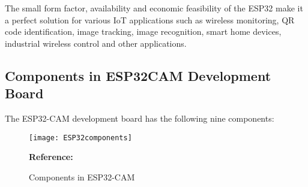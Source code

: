 The small form factor, availability and economic feasibility of the ESP32 make it a perfect solution for various IoT applications such as wireless monitoring, QR code identification, image tracking, image recognition, smart home devices, industrial wireless control and other applications.\\

\subsection{Components in ESP32CAM Development Board}
The ESP32-CAM development board has the following nine components:
\begin{figure}  [H]
	\begin{center}
		\texttt{[image: ESP32components]}
		\caption{Components in ESP32-CAM} 
		\label{fig:Components in ESP32 Cam}
		\footnotesize \textbf{Reference:} \autocite{Lab:2021}
	\end{center}
\end{figure}

